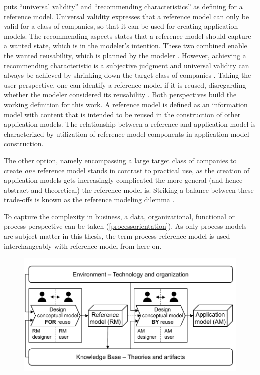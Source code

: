 			\cite{Schutte1998} puts \enquote{universal validity} and \enquote{recommending characteristics} as defining  for a reference model. Universal validity expresses that a reference model can only be valid for a class of companies, so that it can be used for creating application models. The recommending aspects states that a reference model should capture a wanted state, which is in the modeler's intention. These two combined enable the wanted reusability, which is planned by the modeler \citep[]{brocke2003referenzmodellierung}. However, achieving a recommending characteristic is a subjective judgment and universal validity can always be achieved by shrinking down the target class of companies \citep{thomas2006a}. Taking the user perspective, one can identify a reference model if it is reused, disregarding whether the modeler considered its reusability  \citep{Puster2015}. Both perspectives build the working definition for this work. A reference model is defined as an information model with content that is intended to be reused in the construction of other application models. The relationship between a reference and application model is characterized by utilization of reference model components in application model construction. 
			
			The other option, namely encompassing a large target class of companies to create \textit{one} reference model stands in contrast to practical use, as the creation of application models gets increasingly complicated the more general (and hence abstract and theoretical) \citep[]{Schutte1998} the reference model is. Striking a balance between these trade-offs is known as the reference modeling dilemma \citep{delfmann2006adaptive}. 
		
			To capture the complexity in business, a data, organizational, functional or process perspective can be taken (\cf \ref{processorientation}). As only process models are subject matter in this thesis, the term process reference model is used interchangeably with reference model from here on. 

				  
				  \begin{figure}[caption={Design Process of Reusable Conceptual Models}, label={fig:refmodconst}]
				  	{	\includegraphics[width=.8\textwidth]{figures/refmodconst.pdf} \\
				  		\parbox{0.8\textwidth}{}
				  	}
				  		
				  \end{figure} 
				  
